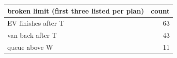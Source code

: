 \begin{tabular}{@{}lr@{}}
\toprule
broken limit (first three listed per plan) & count \\
\midrule
EV finishes after T & 63 \\
van back after T & 43 \\
queue above W & 11 \\
\bottomrule
\end{tabular}
